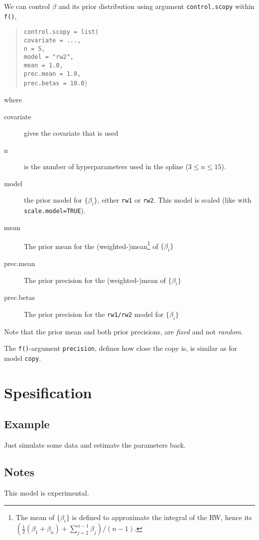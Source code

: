 \documentclass[a4paper,11pt]{article}
\begin{document}
We can control $\beta$ and its prior distribution using argument
\texttt{control.scopy} within \texttt{f()},
\begin{quote}
    \texttt{control.scopy = list(\\
        covariate = ..., \\
        n = 5, \\
        model = "rw2",\\
        mean = 1.0, \\
        prec.mean =  1.0,  \\
        prec.betas =  10.0})
\end{quote}
where
\begin{description}
\item[covariate] gives the covariate that is used
\item[n] is the number of hyperparameters used in the spline
    ($3 \leq n \leq 15$).
\item[model] the prior model for $\{\beta_i\}$, either \texttt{rw1} or
    \texttt{rw2}. This model is scaled (like with
    \texttt{scale.model=TRUE}).
\item[mean] The prior mean for the (weighted-)mean\footnote{The mean
        of $\{\beta_i\}$ is defined to approximate the integral of the
        RW, hence its
        $\left(\frac{1}{2}(\beta_1 + \beta_n) +
          \sum_{j=2}^{n-1}\beta_j\right)/(n-1)$.} of $\{\beta_i\}$
\item[prec.mean] The prior precision for the (weighted-)mean of
    $\{\beta_i\}$
\item[prec.betas] The prior precision for the \texttt{rw1/rw2} model
    for $\{\beta_i\}$
\end{description}
Note that the prior mean and both prior precisions, are \emph{fixed}
and not \emph{random}.

The \texttt{f()}-argument \texttt{precision}, defines how close the
copy is, is similar as for model \texttt{copy}.

\clearpage
\section*{Spesification}


\clearpage
\subsection*{Example}
Just simulate some data and estimate the parameters back. 
{\small}

\subsection*{Notes}

This model is experimental.
\end{document}

